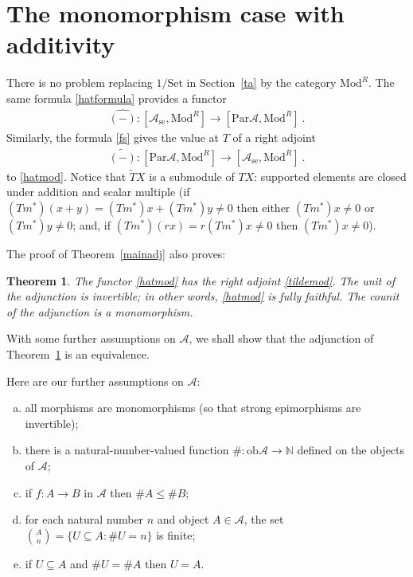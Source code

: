 \documentclass[a4paper,12pt,reqno]{amsart}
\newtheorem{theorem}{Theorem}[section] %
\theoremstyle{definition}
\theoremstyle{fact}
\theoremstyle{genquest}
\theoremstyle{step}
\newcommand{\lra}{\longrightarrow}
\def\CA{{\mathscr A}}
\begin{document}
\section{The monomorphism case with additivity}

There is no problem replacing $1/\mathrm{Set}$ in Section~\ref{ta} by 
the category $\mathrm{Mod}^R$. The same formula \eqref{hatformula}
provides a functor
\begin{eqnarray}\label{hatmod}
\widehat{(-)} : [\CA_{\mathrm{se}}, \mathrm{Mod}^R] \lra [\mathrm{Par}\CA, \mathrm{Mod}^R] \ .
\end{eqnarray}
Similarly, the formula \eqref{fs} gives the value at $T$ of a right adjoint 
\begin{eqnarray}\label{tildemod}
\widetilde{(-)} : [\mathrm{Par}\CA, \mathrm{Mod}^R] \lra [\CA_{\mathrm{se}}, \mathrm{Mod}^R] \ .
\end{eqnarray}
to \eqref{hatmod}. Notice that $\widetilde{T}X$ is a submodule of $TX$: supported
elements are closed under addition and scalar multiple
(if $(Tm^*)(x+y)= (Tm^*)x+(Tm^*)y \neq 0$ then either $(Tm^*)x \neq 0$ or $(Tm^*)y \neq 0$; and, if $(Tm^*)(rx)= r(Tm^*)x \neq 0$ then $(Tm^*)x \neq 0$).   

The proof of Theorem~\ref{mainadj} also proves:
\begin{theorem}\label{modadj}
The functor \eqref{hatmod} has the right adjoint \eqref{tildemod}.
The unit of the adjunction is invertible; in other words, \eqref{hatmod} is fully faithful.
The counit of the adjunction is a monomorphism. 
\end{theorem}

With some further assumptions on $\CA$, we shall show that the adjunction
of Theorem~\ref{modadj} is an equivalence.

Here are our further assumptions on $\CA$:
\begin{enumerate}[(a)]
\item all morphisms are monomorphisms (so that strong epimorphisms are invertible);
\item there is a natural-number-valued function 
$\# : \mathrm{ob}\CA \lra \mathbb{N}$ defined on the objects of $\CA$;
\item if $f:A\lra B$ in $\CA$ then $\#A\le \#B$;
\item for each natural number $n$ and object $A \in \CA$, the set 
$\binom{A}{n} = \{U \subseteq A : \# U = n \}$
is finite;
\item if $U \subseteq A$ and $\#U=\#A$ then $U= A$.
 \end{enumerate}
\end{document}
